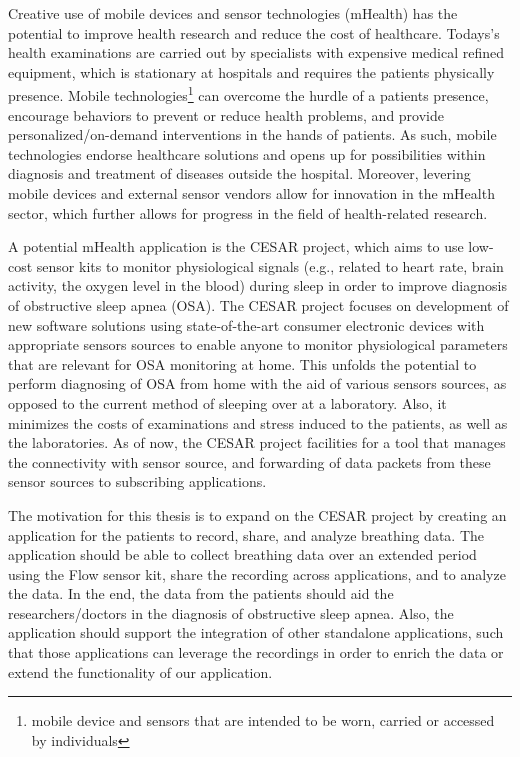 Creative use of mobile devices and sensor technologies (mHealth) has the potential to improve health research and reduce the cost of healthcare. Todays's health examinations are carried out by specialists with expensive medical refined equipment, which is stationary at hospitals and requires the patients physically presence.  Mobile technologies\footnote{mobile device and sensors that are intended to be worn, carried or accessed by individuals} can overcome the hurdle of a patients presence, encourage behaviors to prevent or reduce health problems, and provide personalized/on-demand interventions \cite{kumar2013mobile} in the hands of patients. As such, mobile technologies endorse healthcare solutions and opens up for possibilities within diagnosis and treatment of diseases outside the hospital. Moreover, levering mobile devices and external sensor vendors allow for innovation in the mHealth sector, which further allows for progress in the field of health-related research.   

A potential mHealth application is the CESAR project, which aims to use low-cost sensor kits to monitor physiological signals (e.g., related to heart rate, brain activity, the oxygen level in the blood) during sleep in order to improve diagnosis of obstructive sleep apnea (OSA). The CESAR project \cite{cesar} focuses on development of new software solutions using state-of-the-art consumer electronic devices with appropriate sensors sources to enable anyone to monitor physiological parameters that are relevant for OSA monitoring at home. This unfolds the potential to perform diagnosing of OSA from home with the aid of various sensors sources, as opposed to the current method of sleeping over at a laboratory. Also, it minimizes the costs of examinations and stress induced to the patients, as well as the laboratories. As of now, the CESAR project facilities for a tool that manages the connectivity with sensor source, and forwarding of data packets from these sensor sources to subscribing applications. 

The motivation for this thesis is to expand on the CESAR project by creating an application for the patients to record, share, and analyze breathing data. The application should be able to collect breathing data over an extended period using the Flow sensor kit, share the recording across applications, and to analyze the data. In the end, the data from the patients should aid the researchers/doctors in the diagnosis of obstructive sleep apnea. Also, the application should support the integration of other standalone applications, such that those applications can leverage the recordings in order to enrich the data or extend the functionality of our application.  